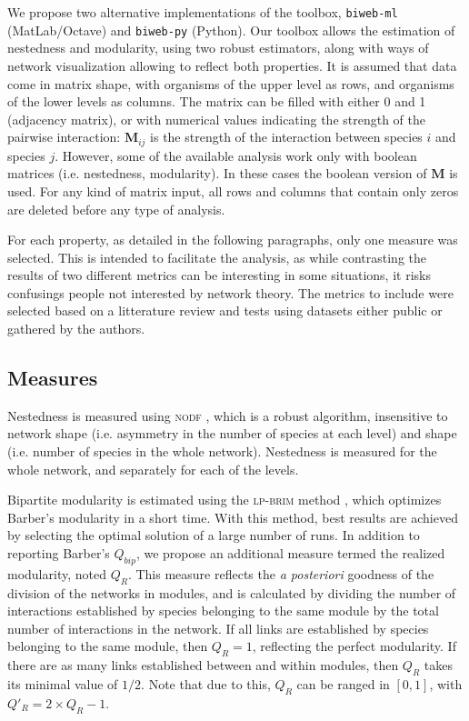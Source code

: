 \documentclass[10pt]{bmc_article}
\newenvironment{bmcformat}{\fussy\setboolean{publ}{true}}{\fussy}
\begin{document}
\begin{bmcformat}
We propose two alternative implementations of the toolbox, \texttt{biweb-ml}
(MatLab/Octave) and \texttt{biweb-py} (Python). Our toolbox allows the
estimation of nestedness and modularity, using two robust estimators, along
with ways of network visualization allowing to reflect both properties. It is
assumed that data come in matrix shape, with organisms of the upper level as
rows, and organisms of the lower levels as columns. The matrix can be filled
with either 0 and 1 (adjacency matrix), or with numerical values indicating
the strength of the pairwise interaction: $\mathbf{M}_{ij}$ is the strength of
the interaction between species $i$ and species $j$. However, some of the
available analysis work only with boolean matrices (i.e. nestedness,
modularity). In these cases the boolean version of $\mathbf{M}$ is used. For
any kind of matrix input, all rows and columns that contain only zeros are
deleted before any type of analysis.

For each property, as detailed in the following paragraphs, only one measure
was selected. This is intended to facilitate the analysis, as while
contrasting the results of two different metrics can be interesting in some
situations, it risks confusings people not interested by network theory. The
metrics to include were selected based on a litterature review and tests using
datasets either public or gathered by the authors.

\subsection*{Measures}

Nestedness is measured using \textsc{nodf} \cite{Almeida-Neto2008}, which is a
robust algorithm, insensitive to network shape (i.e. asymmetry in the number
of species at each level) and shape (i.e. number of species in the whole
network). Nestedness is measured for the whole network, and separately for
each of the levels.

Bipartite modularity is estimated using the \textsc{lp-brim} method
\cite{Liu2010a}, which optimizes Barber's modularity
\cite{Barber2007,Barber2008} in a short time. With this method, best results
are achieved by selecting the optimal solution of a large number of runs. In
addition to reporting Barber's $Q_{bip}$, we propose an additional measure
termed the realized modularity, noted $Q_{R}$. This measure reflects the
\emph{a posteriori} goodness of the division of the networks in modules, and
is calculated by dividing the number of interactions established by species
belonging to the same module by the total number of interactions in the
network. If all links are established by species belonging to the same module,
then $Q_{R} = 1$, reflecting the perfect modularity. If there are as many
links established between and within modules, then $Q_{R}$ takes its minimal
value of $1/2$. Note that due to this, $Q_{R}$ can be ranged in $[0,1]$, with
$Q'_{R} = 2\times Q_{R}-1$.


\end{bmcformat}
\end{document}
